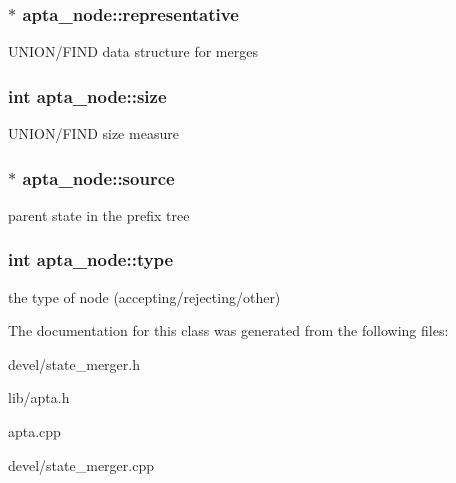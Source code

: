 \subsubsection[{\texorpdfstring{representative}{representative}}]{ $\ast$ apta\+\_\+node\+::representative}\hypertarget{classapta__node_aa2947d27209a9befd6458060419b2f43}{}\label{classapta__node_aa2947d27209a9befd6458060419b2f43}
U\+N\+I\+O\+N/\+F\+I\+ND data structure for merges 
\subsubsection[{\texorpdfstring{size}{size}}]{\setlength{\rightskip}{0pt plus 5cm}int apta\+\_\+node\+::size}\hypertarget{classapta__node_a24c9dae152b759bb6a2ebcae6bbc36d5}{}\label{classapta__node_a24c9dae152b759bb6a2ebcae6bbc36d5}
U\+N\+I\+O\+N/\+F\+I\+ND size measure 
\subsubsection[{\texorpdfstring{source}{source}}]{ $\ast$ apta\+\_\+node\+::source}\hypertarget{classapta__node_a7a04123201ce6998a773656fa40cc60e}{}\label{classapta__node_a7a04123201ce6998a773656fa40cc60e}
parent state in the prefix tree 
\subsubsection[{\texorpdfstring{type}{type}}]{\setlength{\rightskip}{0pt plus 5cm}int apta\+\_\+node\+::type}\hypertarget{classapta__node_a9c1cf7c316ab485ff4435f90dda2766e}{}\label{classapta__node_a9c1cf7c316ab485ff4435f90dda2766e}
the type of node (accepting/rejecting/other) 

The documentation for this class was generated from the following files\+:\begin{DoxyCompactItemize}
\item 
devel/state\+\_\+merger.\+h\item 
lib/apta.\+h\item 
apta.\+cpp\item 
devel/state\+\_\+merger.\+cpp\end{DoxyCompactItemize}
